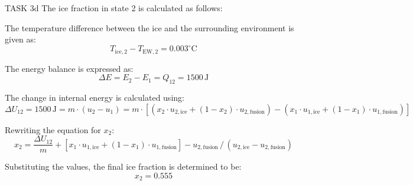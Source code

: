 TASK 3d  
The ice fraction in state 2 is calculated as follows:  

The temperature difference between the ice and the surrounding environment is given as:  
\[
T_{\text{ice},2} - T_{\text{EW},2} = 0.003^\circ\text{C}
\]  

The energy balance is expressed as:  
\[
\Delta E = E_2 - E_1 = Q_{12} = 1500 \, \text{J}
\]  

The change in internal energy is calculated using:  
\[
\Delta U_{12} = 1500 \, \text{J} = m \cdot (u_2 - u_1) = m \cdot \left[ (x_2 \cdot u_{2,\text{ice}} + (1 - x_2) \cdot u_{2,\text{fusion}}) - (x_1 \cdot u_{1,\text{ice}} + (1 - x_1) \cdot u_{1,\text{fusion}}) \right]
\]  

Rewriting the equation for \( x_2 \):  
\[
x_2 = \frac{\Delta U_{12}}{m} + \left[ x_1 \cdot u_{1,\text{ice}} + (1 - x_1) \cdot u_{1,\text{fusion}} \right] - u_{2,\text{fusion}} \, \bigg/ \, (u_{2,\text{ice}} - u_{2,\text{fusion}})
\]  

Substituting the values, the final ice fraction is determined to be:  
\[
x_2 = 0.555
\]